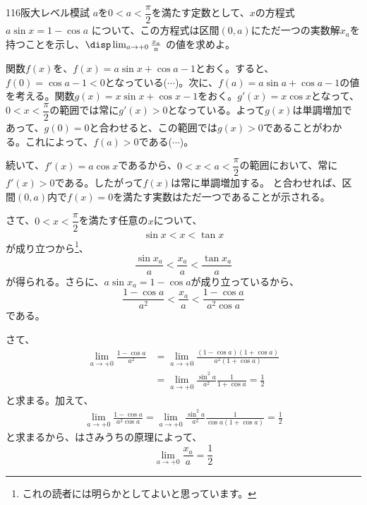\begin{prob}{116}{}{阪大レベル模試}
 $a$を$0<a<\dfrac{\pi}{2}$を満たす定数として、$x$の方程式 $a\sin x = 1-\cos a$ について、この方程式は区間$(0,a)$にただ一つの実数解$x_a$を持つことを示し、$\disp \lim_{a\to +0} \frac{x_a}{a}$ の値を求めよ。
\end{prob}
関数$f(x)$を、$f(x)=a\sin x+\cos a-1$とおく。すると、$f(0)=\cos a-1 < 0$となっている($\cdots$)。次に、$f(a)=a\sin a+\cos a-1$の値を考える。関数$g(x)=x\sin x+\cos x-1$をおく。$g'(x)=x\cos x$となって、$0<x<\dfrac{\pi}{2}$の範囲では常に$g'(x)>0$となっている。よって$g(x)$は単調増加であって、$g(0)=0$と合わせると、この範囲では$g(x)>0$であることがわかる。これによって、$f(a)>0$である($\cdots$)。

続いて、$f'(x)=a\cos x$であるから、$0<x<a<\dfrac{\pi}{2}$の範囲において、常に$f'(x)>0$である。したがって$f(x)$は常に単調増加する。 と合わせれば、区間$(0, a)$内で$f(x)=0$を満たす実数はただ一つであることが示される。

さて、$0<x<\dfrac{\pi}{2}$を満たす任意の$x$について、
\[ \sin x < x < \tan x \]
が成り立つから\footnote{これの読者には明らかとしてよいと思っています。}、
\[ \frac{\sin x_a}{a} < \frac{x_a}{a} < \frac{\tan x_a}{a} \]
が得られる。さらに、$a\sin x_a=1-\cos a$が成り立っているから、
\[ \frac{1-\cos a}{a^2} < \frac{x_a}{a} < \frac{1-\cos a}{a^2\cos a} \]
である。

さて、
\begin{align*}
 \lim_{a\to +0} \frac{1-\cos a}{a^2}&=\lim_{a\to +0} \frac{(1-\cos a)(1+\cos a)}{a^2(1+\cos a)} \\
 &= \lim_{a\to +0} \frac{\sin^2 a}{a^2} \frac{1}{1+\cos a} = \frac{1}{2}
\end{align*}
と求まる。加えて、
\begin{align*}
 \lim_{a\to +0} \frac{1-\cos a}{a^2\cos a}=\lim_{a\to +0} \frac{\sin^2 a}{a^2} \frac{1}{\cos a(1+\cos a)}=\frac{1}{2}
\end{align*}
と求まるから、はさみうちの原理によって、
\[ \lim_{a\to +0} \frac{x_a}{a} =\frac{1}{2} \]

